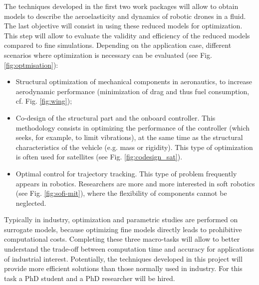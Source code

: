 \documentclass[12pt]{article}
\begin{document}
	The techniques developed in the first two work packages will allow to obtain models to describe the aeroelasticity and dynamics of robotic drones in a fluid.
	The last objective will consist in using these reduced models for optimization. This step will allow to evaluate the validity and efficiency of the reduced models compared to fine simulations. Depending on the application case, different scenarios where optimization is necessary can be evaluated (see Fig. \ref{fig:optmisation}): 
	\begin{itemize}
		\item Structural optimization of mechanical components in aeronautics, to increase aerodynamic performance (minimization of drag and thus fuel consumption, cf. Fig. \ref{fig:wing}); 
		\item Co-design of the structural part and the onboard controller. This methodology consists in optimizing the performance of the controller (which seeks, for example, to limit vibrations), at the same time as the structural characteristics of the vehicle (e.g. mass or rigidity). This type of optimization is often used for satellites (see Fig. \ref{fig:codesign_sat}).
		\item Optimal control for trajectory tracking. This type of problem frequently appears in robotics. Researchers are more and more interested in soft robotics (see Fig. \ref{fig:sofi-mit}), where the flexibility of components cannot be neglected.
	\end{itemize}
	
	Typically in industry, optimization and parametric studies are performed on surrogate models, because optimizing fine models directly leads to prohibitive computational costs. Completing these three macro-tasks will allow to better understand the trade-off between computation time and accuracy for
	applications of industrial interest. Potentially, the techniques developed in this project will provide more efficient solutions than those normally used in industry. For this task a PhD student and a PhD researcher will be hired. 
	
\end{document}
